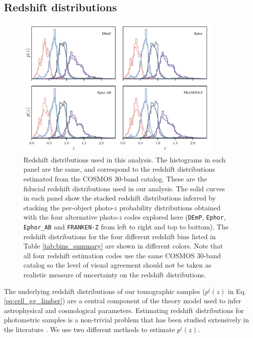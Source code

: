 \documentclass[a4paper,11pt]{article}
\begin{document}
  \subsection{Redshift distributions}\label{ssec:methods.nz}
    \begin{figure}
      \centering
      \includegraphics[width=0.9\textwidth]{figures/nzs.pdf}
      \caption{Redshift distributions used in this analysis. The histograms in each panel are the same, and correspond to the redshift distributions estimated from the COSMOS 30-band catalog. These are the fiducial redshift distributions used in our analysis. The solid curves in each panel show the stacked redshift distributions inferred by stacking the per-object photo-$z$ probability distributions obtained with the four alternative photo-$z$ codes explored here ({\tt DEmP}, {\tt Ephor}, {\tt Ephor\_AB} and {\tt FRANKEN-Z} from left to right and top to bottom). The redshift distributions for the four different redshift bins listed in Table \ref{tab:bins_summary} are shown in different colors. Note that all four redshift estimation codes use the same COSMOS 30-band catalog so the level of visual agreement should not be taken as realistic measure of uncertainty on the redshift distributions.}
      \label{fig:nzs}
    \end{figure}
    The underlying redshift distributions of our tomographic samples ($p^i(z)$ in Eq. \ref{eq:cell_gg_limber}) are a central component of the theory model used to infer astrophysical and cosmological parameters. Estimating redshift distributions for photometric samples is a non-trivial problem that has been studied extensively in the literature \citep{2008MNRAS.390..118L,2008ApJ...684...88N,2018MNRAS.478..592H}. We use two different methods to estimate $p^i(z)$.
    
\end{document}
